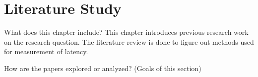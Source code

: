 \chapter{Literature Study}

What does this chapter include?
This chapter introduces previous research work on the research question.
The literature review is done to figure out methods used for measurement of latency.

How are the papers explored or analyzed? (Goals of this section)
